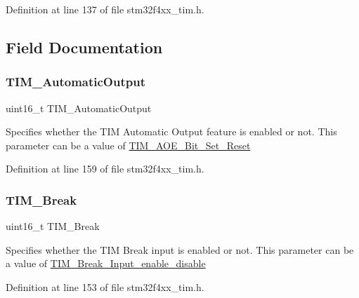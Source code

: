 Definition at line 137 of file stm32f4xx\+\_\+tim.\+h.



\subsection{Field Documentation}
\mbox{\label{struct_t_i_m___b_d_t_r_init_type_def_a85ef0b5598749ffd67dd360e615bcf9a}} 
\subsubsection{\texorpdfstring{T\+I\+M\+\_\+\+Automatic\+Output}{TIM\_AutomaticOutput}}
{\footnotesize\ttfamily uint16\+\_\+t T\+I\+M\+\_\+\+Automatic\+Output}

Specifies whether the T\+IM Automatic Output feature is enabled or not. This parameter can be a value of \hyperlink{group___t_i_m___a_o_e___bit___set___reset}{T\+I\+M\+\_\+\+A\+O\+E\+\_\+\+Bit\+\_\+\+Set\+\_\+\+Reset} 

Definition at line 159 of file stm32f4xx\+\_\+tim.\+h.

\mbox{\label{struct_t_i_m___b_d_t_r_init_type_def_a7f141e06bab7928bc0b8327f0d20e664}} 
\subsubsection{\texorpdfstring{T\+I\+M\+\_\+\+Break}{TIM\_Break}}
{\footnotesize\ttfamily uint16\+\_\+t T\+I\+M\+\_\+\+Break}

Specifies whether the T\+IM Break input is enabled or not. This parameter can be a value of \hyperlink{group___t_i_m___break___input__enable__disable}{T\+I\+M\+\_\+\+Break\+\_\+\+Input\+\_\+enable\+\_\+disable} 

Definition at line 153 of file stm32f4xx\+\_\+tim.\+h.


